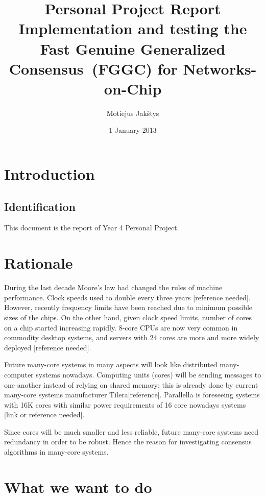 \documentclass[english,11pt]{article}
\newcommand{\fggc}{Fast Genuine Generalized Consensus\ }
\begin{document}
\title{Personal Project Report\\
    Implementation and testing the \fggc (FGGC) for Networks-on-Chip}
\author{Motiejus Jakštys}
\date{1 January 2013}

\maketitle
\pagebreak
\tableofcontents
\pagebreak

\section{Introduction}
\subsection{Identification}

This document is the report of Year 4 Personal Project.

\section{Rationale}

During the last decade Moore's law had changed the rules of machine
performance. Clock speeds used to double every three years [reference needed].
However, recently frequency limits have been reached due to minimum possible
sizes of the chips. On the other hand, given clock speed limits, number of
cores on a chip started increasing rapidly. 8-core CPUs are now very common in
commodity desktop systems, and servers with 24 cores are more and more widely
deployed [reference needed].

Future many-core systems in many aspects will look like distributed
many-computer systems nowadays. Computing units (cores) will be sending
messages to one another instead of relying on shared memory; this is already
done by current many-core systems manufacturer Tilera[reference]. Parallella is
foreseeing systems with 16K cores with similar power requirements of 16 core
nowadays systems [link or reference needed].

Since cores will be much smaller and less reliable, future many-core systems
need redundancy in order to be robust. Hence the reason for investigating
consensus algorithms in many-core systems.

\section{What we want to do}
\end{document}
